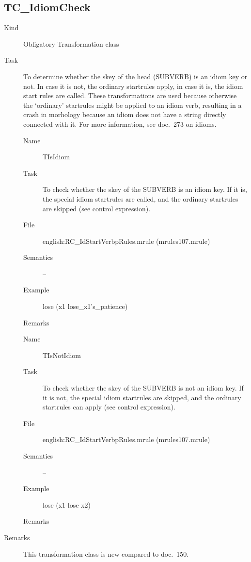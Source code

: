 \subsection{TC\_IdiomCheck}
\begin{description}
\item[Kind] Obligatory Transformation class
\item[Task] To determine whether the skey of the head (SUBVERB) is an idiom key 
or not. In case it is not, the ordinary startrules apply, in case it is, the
idiom start rules are called. These transformations are used because otherwise 
the `ordinary' startrules might be applied to an idiom verb, resulting in a 
crash in morhology because an idiom does not have a string directly connected 
with it. For more information, see doc.\ 273 on idioms.

\vspace{1 cm}
\begin{description}
\item[Name] TIsIdiom
\item[Task] To check whether the skey of the SUBVERB is an idiom key. If it is,
the special idiom startrules are called, and the ordinary startrules are 
skipped (see control expression).
\item[File] english:RC\_IdStartVerbpRules.mrule (mrules107.mrule)
\item[Semantics] --
\item[Example] lose (x1 lose\_x1's\_patience)
\item[Remarks]
\end{description}

\vspace{1 cm}
\begin{description}
\item[Name] TIsNotIdiom
\item[Task] To check whether the skey of the SUBVERB is not an idiom key. If it 
is not, the special idiom startrules are skipped, and the ordinary startrules 
can apply (see control expression).
\item[File] english:RC\_IdStartVerbpRules.mrule (mrules107.mrule)
\item[Semantics] --
\item[Example] lose (x1 lose x2)
\item[Remarks]
\end{description}

\vspace{1 cm}
\item[Remarks] This transformation class is new compared to doc.\ 150. 
\end{description}

